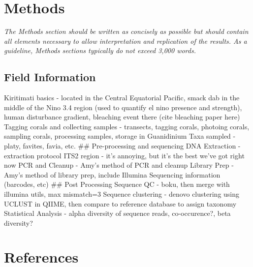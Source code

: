 \documentclass[]{article}
\begin{document}
\section{Methods}\label{methods}

\emph{The Methods section should be written as concisely as possible but
should contain all elements necessary to allow interpretation and
replication of the results. As a guideline, Methods sections typically
do not exceed 3,000 words.}

\subsection{Field Information}\label{field-information}

Kiritimati basics - located in the Central Equatorial Pacific, smack dab
in the middle of the Nino 3.4 region (used to quantify el nino presence
and strength), human disturbance gradient, bleaching event there (cite
bleaching paper here) Tagging corals and collecting samples - transects,
tagging corals, photoing corals, sampling corals, processing samples,
storage in Guanidinium Taxa sampled - platy, favites, favia, etc. \#\#
Pre-processing and sequencing DNA Extraction - extraction protocol ITS2
region - it's annoying, but it's the best we've got right now PCR and
Cleanup - Amy's method of PCR and cleanup Library Prep - Amy's method of
library prep, include Illumina Sequencing information (barcodes, etc)
\#\# Post Processing Sequence QC - boku, then merge with illumina utils,
max mismatch=3 Sequence clustering - denovo clustering using UCLUST in
QIIME, then compare to reference database to assign taxonomy Statistical
Analysis - alpha diversity of sequence reads, co-occurence?, beta
diversity?

\section{References}\label{references}
\end{document}
